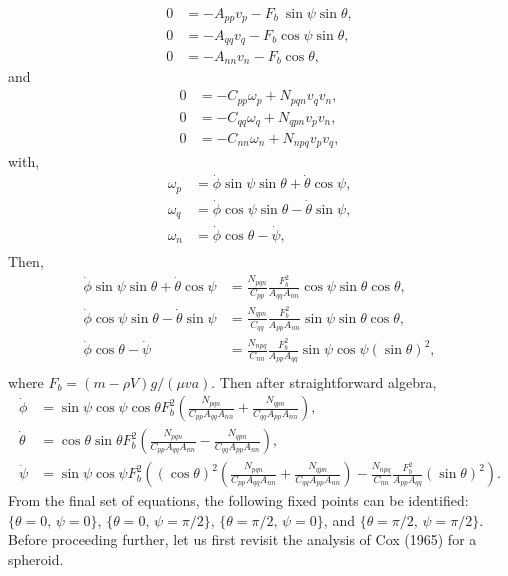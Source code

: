 \documentclass[12pt]{My_preprint}
\begin{document}
\begin{align}
    0 &= -A_{pp} v_p - F_b\ \sin \psi \sin \theta, \label{eq:vp}\\
    0 &= -A_{qq} v_q - F_b\cos \psi \sin \theta,
\label{eq:vq} \\
   0 &= -A_{nn} v_n - F_b\cos \theta,
\label{eq:vn}
\end{align}
and
\begin{align}
    0 &= -C_{pp} \omega_p + N_{pqn} v_q v_n, \label{eq:omp}\\
    0 &= -C_{qq} \omega_q + N_{qpn} v_p v_n, \label{eq:omq} \\
   0 &= -C_{nn} \omega_n + N_{npq} v_p v_q,\label{eq:omn}
\end{align}
with,
\begin{align}
    \omega_p &= \dot \phi \sin \psi \sin \theta +  \dot \theta \cos \psi, \\
    \omega_q &= \dot \phi \cos \psi \sin \theta -  \dot \theta \sin \psi, \\
    \omega_n &= \dot \phi \cos \theta -  \dot \psi, \\
\end{align}
Then,
\begin{align}
    \dot \phi \sin \psi \sin \theta +  \dot \theta \cos \psi &= \frac{N_{pqn}}{C_{pp}} \frac{F_b^2}{A_{qq} A_{nn}}\cos \psi \sin \theta\cos \theta, \\
    \dot \phi \cos \psi \sin \theta -  \dot \theta \sin \psi &= \frac{N_{qpn}}{C_{qq}} \frac{F_b^2}{A_{pp} A_{nn}}\sin \psi \sin \theta\cos \theta, \\
    \dot \phi \cos \theta -  \dot \psi &= \frac{N_{npq}}{C_{nn}}\frac{F_b^2}{A_{pp} A_{qq}}\sin \psi \cos \psi (\sin \theta) ^2,\\
\end{align}
where $F_b = (m-\rho V)g/(\mu v a)$.
Then after straightforward algebra,
\begin{align}
    \dot \phi  &= \sin \psi \cos \psi  \cos \theta F_b^2 \left(\frac{N_{pqn}}{C_{pp}A_{qq} A_{nn}}+\frac{N_{qpn}}{C_{qq}A_{pp} A_{nn}}\right), \\
    \dot \theta  &= \cos \theta \sin \theta F_b^2 \left(\frac{N_{pqn}}{C_{pp}A_{qq} A_{nn}} - \frac{N_{qpn}}{C_{qq}A_{pp} A_{nn}}\right), \\
    \dot \psi   &= \sin \psi \cos \psi F_b^2 \left((\cos \theta)^2\left(\frac{N_{pqn}}{C_{pp}A_{qq} A_{nn}}+\frac{N_{qpn}}{C_{qq}A_{pp} A_{nn}}\right)-\frac{N_{npq}}{C_{nn}}\frac{F_b^2}{A_{pp} A_{qq}}(\sin \theta) ^2\right).
\end{align}
From the final set of equations, the following fixed points can be identified:
$\{\theta = 0, \, \psi = 0\}$, $\{\theta = 0, \, \psi = \pi/2\}$, $\{\theta = \pi/2, \, \psi = 0\}$, and $\{\theta = \pi/2, \, \psi = \pi/2\}$.
Before proceeding further, let us first revisit the analysis of Cox (1965) for a spheroid.
\end{document}
